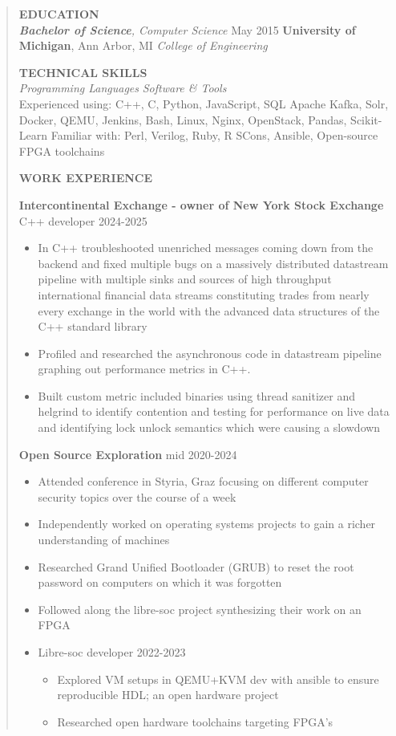 \documentclass[11pt,a4paper]{article}
\begin{document}
\begin{quote}
\textbf{EDUCATION}\\
\emph{\textbf{Bachelor of Science}, Computer Science} May 2015
\textbf{University of Michigan}, Ann Arbor, MI \emph{College of
Engineering}

\textbf{TECHNICAL SKILLS}\\
\emph{Programming Languages} \emph{Software \& Tools}\\
Experienced using: C++, C, Python, JavaScript, SQL Apache Kafka, Solr,
Docker, QEMU, Jenkins, Bash, Linux, Nginx, OpenStack, Pandas,
Scikit-Learn Familiar with: Perl, Verilog, Ruby, R SCons, Ansible,
Open-source FPGA toolchains

\textbf{WORK EXPERIENCE}

\textbf{Intercontinental Exchange - owner of New York Stock Exchange} C++ developer 2024-2025
\begin{itemize}
\item In C++ troubleshooted unenriched messages coming down from the backend and fixed multiple bugs on a massively distributed datastream pipeline with multiple sinks and sources of high throughput international financial data streams constituting trades from nearly every exchange in the world with the advanced data structures of the C++ standard library 
\item Profiled and researched the asynchronous code in datastream pipeline graphing out performance metrics in C++.
\item Built custom metric included binaries using thread sanitizer and helgrind to identify contention and testing for performance on live data and identifying lock unlock semantics which were causing a slowdown
\end{itemize}

\textbf{Open Source Exploration} mid 2020-2024
\begin{itemize}
\item Attended conference in
Styria, Graz focusing on different computer security topics over the
course of a week
\item Independently worked on operating systems projects to
gain a richer understanding of machines
\item Researched Grand Unified Bootloader (GRUB) to reset the root password on
computers on which it was forgotten
\item Followed along the libre-soc project synthesizing their work on an FPGA
\item Libre-soc developer 2022-2023
\begin{itemize}
\item Explored VM setups in QEMU+KVM dev with ansible to ensure reproducible HDL; an open hardware project
\item Researched open hardware toolchains targeting FPGA's
\end{itemize}
\end{itemize}


\end{quote}
\end{document}
